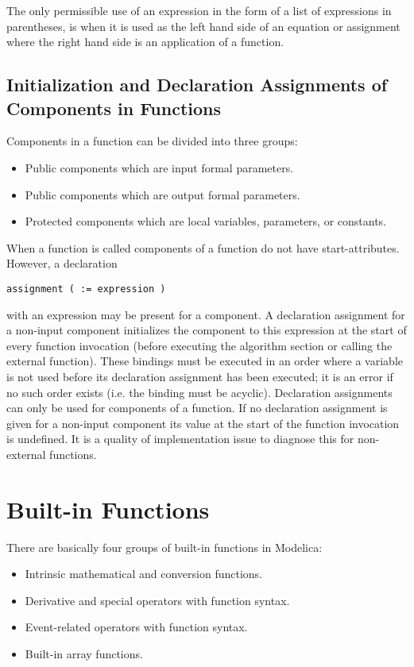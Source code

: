 \documentclass[11pt,a4paper,notitlepage]{report}
\begin{document}
The only permissible use of an expression in the form of a list of expressions in parentheses, is when it is used as the left hand side of an equation or assignment where the right hand side is an application of a function.

\subsection{Initialization and Declaration Assignments of Components in Functions}

Components in a function can be divided into three groups:
\begin{itemize}
\item Public components which are input formal parameters.
\item Public components which are output formal parameters.
\item Protected components which are local variables, parameters, or constants.   
\end{itemize}

When a function is called components of a function do not have start-attributes. However, a declaration 

\verb"assignment ( := expression )" 

with an expression may be present for a component.
A declaration assignment for a non-input component initializes the component to this expression at the start of every function invocation (before executing the algorithm section or calling the external function). These bindings must be executed in an order where a variable is not used before its declaration assignment has been executed; it is an error if no such order exists (i.e. the binding must be acyclic).
Declaration assignments can only be used for components of a function. If no declaration assignment is given for a non-input component its value at the start of the function invocation is undefined. It is a quality of implementation issue to diagnose this for non-external functions.

\section{Built-in Functions}

There are basically four groups of built-in functions in Modelica:

\begin{itemize}
\item Intrinsic mathematical and conversion functions.
\item Derivative and special operators with function syntax.
\item Event-related operators with function syntax.
\item Built-in array functions.  
\end{itemize}
\end{document}
